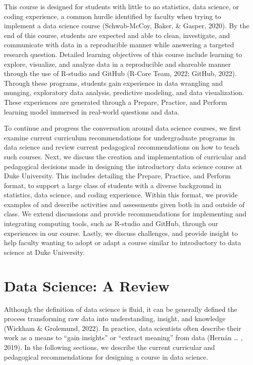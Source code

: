 \documentclass[
  12pt]{article}
\begin{document}
This course is designed for students with little to no statistics, data
science, or coding experience, a common hurdle identified by faculty
when trying to implement a data science course (Schwab-McCoy, Baker, \&
Gasper, 2020). By the end of this course, students are expected and able
to clean, investigate, and communicate with data in a reproducible
manner while answering a targeted research question. Detailed learning
objectives of this course include learning to explore, visualize, and
analyze data in a reproducible and shareable manner through the use of
R-studio and GitHub (R-Core Team, 2022; GitHub, 2022). Through these
programs, students gain experience in data wrangling and munging,
exploratory data analysis, predictive modeling, and data visualization.
These experiences are generated through a Prepare, Practice, and Perform
learning model immersed in real-world questions and data.

To continue and progress the conversation around data science courses,
we first examine current curriculum recommendations for undergraduate
programs in data science and review current pedagogical recommendations
on how to teach such courses. Next, we discuss the creation and
implementation of curricular and pedagogical decisions made in designing
the introductory data science course at Duke University. This includes
detailing the Prepare, Practice, and Perform format, to support a large
class of students with a diverse background in statistics, data science,
and coding experience. Within this format, we provide examples of and
describe activities and assessments given both in and outside of class.
We extend discussions and provide recommendations for implementing and
integrating computing tools, such as R-studio and GitHub, through our
experiences in our course. Lastly, we discuss challenges, and provide
insight to help faculty wanting to adopt or adapt a course similar to
introductory to data science at Duke University.

\hypertarget{sec-review}{%
\section{Data Science: A Review}\label{sec-review}}

Although the definition of data science is fluid, it can be generally
defined the process transforming raw data into understanding, insight,
and knowledge (Wickham \& Grolemund, 2022). In practice, data scientists
often describe their work as a means to ``gain insights'' or ``extract
meaning'' from data (Hernán \ldots{} , 2019). In the following sections,
we describe the current curricular and pedagogical recommendations for
designing a course in data science.
\end{document}
